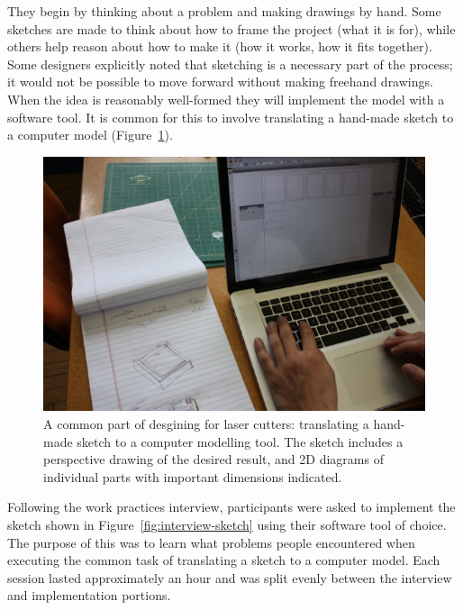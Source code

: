\documentclass{article}
\begin{document}
They begin by thinking about a problem and making drawings by
hand. Some sketches are made to think about how to frame the project
(what it is for), while others help reason about how to make it (how
it works, how it fits together). Some designers explicitly noted that
sketching is a necessary part of the process; it would not be possible
to move forward without making freehand drawings. When the idea is
reasonably well-formed they will implement the model with a software
tool. It is common for this to involve translating a hand-made sketch
to a computer model (Figure~\ref{fig:translate}).

\begin{figure}[h]
  \includegraphics[width=0.9\linewidth]{img/translate-sketch-to-computer.jpg}
  \caption{A common part of desgining for laser cutters: translating a
    hand-made sketch to a computer modelling tool. The sketch includes
    a perspective drawing of the desired result, and 2D diagrams of
    individual parts with important dimensions indicated.}
  \label{fig:translate}
\end{figure}

Following the work practices interview, participants were asked to
implement the sketch shown in Figure~\ref{fig:interview-sketch} using
their software tool of choice. The purpose of this was to learn what
problems people encountered when executing the common task of
translating a sketch to a computer model. Each session lasted
approximately an hour and was split evenly between the interview and
implementation portions.
\end{document}
